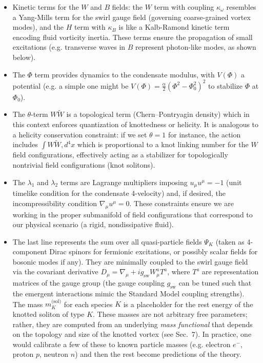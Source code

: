 \documentclass[10pt,reprint,aps,onecolumn,nofootinbib]{revtex4-2}
\begin{document}
\begin{itemize}

\item Kinetic terms for the $W$ and $B$ fields: the $W$ term with coupling $\kappa_\omega$ resembles a Yang-Mills term for the swirl gauge field (governing coarse-grained vortex modes), and the $H$ term with $\kappa_B$ is like a Kalb-Ramond kinetic term encoding fluid vorticity inertia. These terms ensure the propagation of small excitations (e.g. transverse waves in $B$ represent photon-like modes, as shown below).

\item The $\Phi$ term provides dynamics to the condensate modulus, with $V(\Phi)$ a potential (e.g. a simple one might be $V(\Phi) = \frac{\alpha}{2}(\Phi^2-\Phi_0^2)^2$ to stabilize $\Phi$ at $\Phi_0$).

\item The $\theta$-term $W\tilde{W}$ is a topological term (Chern–Pontryagin density) which in this context enforces quantization of knottedness or helicity. It is analogous to a helicity conservation constraint: if we set $\theta = 1$ for instance, the action includes $\int W\tilde{W},d^4x$ which is proportional to a knot linking number for the $W$ field configurations, effectively acting as a stabilizer for topologically nontrivial field configurations (knot solitons).

\item The $\lambda_1$ and $\lambda_2$ terms are Lagrange multipliers imposing $u_\mu u^\mu = -1$ (unit timelike condition for the condensate 4-velocity) and, if desired, the incompressibility condition $\nabla_\mu u^\mu = 0$. These constraints ensure we are working in the proper submanifold of field configurations that correspond to our physical scenario (a rigid, nondissipative fluid).

\item The last line represents the sum over all quasi-particle fields $\Psi_K$ (taken as 4-component Dirac spinors for fermionic excitations, or possibly scalar fields for bosonic modes if any). They are minimally coupled to the swirl gauge field via the covariant derivative $D_\mu = \nabla_\mu + i g_{\text{sw}} W_\mu^a T^a$, where $T^a$ are representation matrices of the gauge group (the gauge coupling $g_{\text{sw}}$ can be tuned such that the emergent interactions mimic the Standard Model coupling strengths). The mass $m^{\text{(sol)}}_{K}$ for each species $K$ is a placeholder for the rest energy of the knotted soliton of type $K$. These masses are not arbitrary free parameters; rather, they are computed from an underlying \emph{mass functional} that depends on the topology and size of the knotted vortex (see Sec.~7). In practice, one would calibrate a few of these to known particle masses (e.g. electron $e^{-}$, proton $p$, neutron $n$) and then the rest become predictions of the theory.

\end{itemize}
\end{document}
